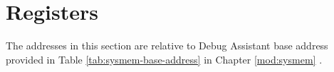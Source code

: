 \documentclass[main\_\_EN.tex]{subfiles}
\begin{document}





\clearpage
\section{Registers}\label{sec:dbgassist-reg}

The addresses in this section are relative to Debug Assistant base address provided in Table \ref{tab:sysmem-base-address} in Chapter \ref{mod:sysmem} \textit{}.


\end{document}

